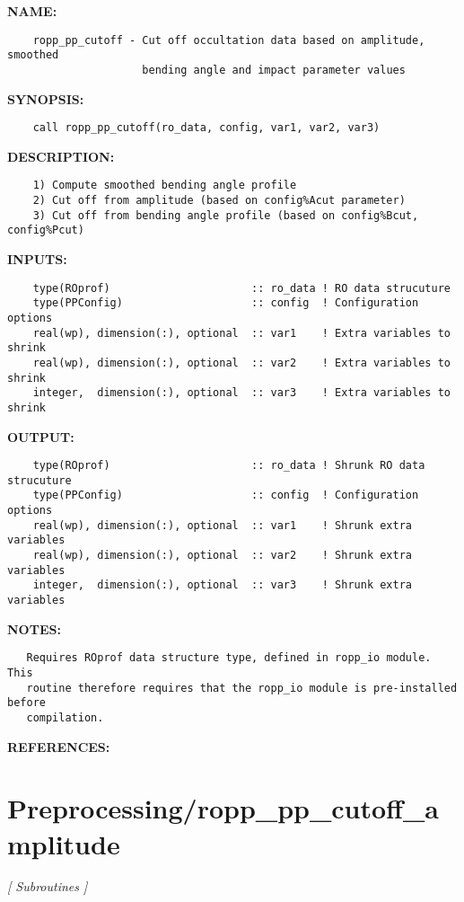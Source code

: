 \label{ch:robo72}
\label{ch:Preprocessing_ropp_pp_cutoff}
\textbf{NAME:}\hspace{0.08in}\begin{Verbatim}
    ropp_pp_cutoff - Cut off occultation data based on amplitude, smoothed
                     bending angle and impact parameter values
\end{Verbatim}
\textbf{SYNOPSIS:}\hspace{0.08in}\begin{Verbatim}
    call ropp_pp_cutoff(ro_data, config, var1, var2, var3)
\end{Verbatim}
\textbf{DESCRIPTION:}\hspace{0.08in}\begin{Verbatim}
    1) Compute smoothed bending angle profile
    2) Cut off from amplitude (based on config%Acut parameter)
    3) Cut off from bending angle profile (based on config%Bcut, config%Pcut)
\end{Verbatim}
\textbf{INPUTS:}\hspace{0.08in}\begin{Verbatim}
    type(ROprof)                      :: ro_data ! RO data strucuture
    type(PPConfig)                    :: config  ! Configuration options
    real(wp), dimension(:), optional  :: var1    ! Extra variables to shrink
    real(wp), dimension(:), optional  :: var2    ! Extra variables to shrink
    integer,  dimension(:), optional  :: var3    ! Extra variables to shrink
\end{Verbatim}
\textbf{OUTPUT:}\hspace{0.08in}\begin{Verbatim}
    type(ROprof)                      :: ro_data ! Shrunk RO data strucuture
    type(PPConfig)                    :: config  ! Configuration options
    real(wp), dimension(:), optional  :: var1    ! Shrunk extra variables
    real(wp), dimension(:), optional  :: var2    ! Shrunk extra variables
    integer,  dimension(:), optional  :: var3    ! Shrunk extra variables
\end{Verbatim}
\textbf{NOTES:}\hspace{0.08in}\begin{Verbatim}
   Requires ROprof data structure type, defined in ropp_io module. This
   routine therefore requires that the ropp_io module is pre-installed before
   compilation.
\end{Verbatim}
\textbf{REFERENCES:}\hspace{0.08in}\section{Preprocessing/ropp\_pp\_cutoff\_amplitude}
\textsl{[ Subroutines ]}

